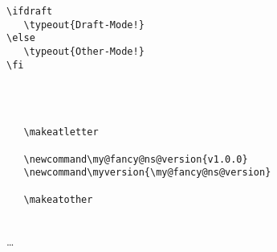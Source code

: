 \begin{frame}[fragile]
\begin{lrbox}\CodeBox
\begin{minipage}{.85\linewidth}
\begin{verbatim}
\ifdraft
   \typeout{Draft-Mode!}
\else
   \typeout{Other-Mode!}
\fi
\end{verbatim}
\end{minipage}
\end{lrbox}
   \begin{focus}
      \\[4mm]%
      \bigskip\\[5mm]
   \end{focus}
\end{frame}



\begin{frame}[fragile]
   \begin{lrbox}\CodeBox
   \begin{minipage}{.85\linewidth}
   \begin{verbatim}
   \makeatletter

   \newcommand\my@fancy@ns@version{v1.0.0}
   \newcommand\myversion{\my@fancy@ns@version}

   \makeatother
   \end{verbatim}
   \end{minipage}
   \end{lrbox}
   \begin{focus}
   \end{focus}
\end{frame}

\begin{frame}
   \begin{focus}
      \bigskip\\
      \ldots
   \end{focus}
\end{frame}

